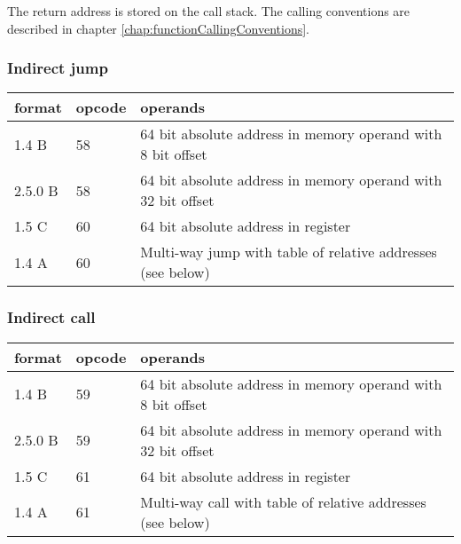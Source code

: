 \documentclass[forwardcom.tex]{subfiles}
\begin{document}
The return address is stored on the call stack. The calling conventions are described in chapter \ref{chap:functionCallingConventions}.


\subsubsection{Indirect jump}

\label{table:indirectJumpInstruction}
\begin{tabular}{|p{12mm}|p{12mm}|p{110mm}|}
\hline
\bfseries format & \bfseries opcode & \bfseries operands \\ \hline
1.4 B & 58 & 64 bit absolute address in memory operand with 8 bit offset \\ \hline
2.5.0 B & 58 & 64 bit absolute address in memory operand with 32 bit offset \\ \hline
1.5 C & 60 & 64 bit absolute address in register \\ \hline
1.4 A & 60 & Multi-way jump with table of relative addresses (see below) \\ \hline
\end{tabular}
\vspace{2mm}


\subsubsection{Indirect call}
\label{table:IndirectCallInstruction}
\begin{tabular}{|p{12mm}|p{12mm}|p{110mm}|}
\hline
\bfseries format & \bfseries opcode & \bfseries operands \\ \hline
1.4 B & 59 & 64 bit absolute address in memory operand with 8 bit offset \\ \hline
2.5.0 B & 59 & 64 bit absolute address in memory operand with 32 bit offset \\ \hline
1.5 C & 61 & 64 bit absolute address in register \\ \hline
1.4 A & 61 & Multi-way call with table of relative addresses (see below) \\ \hline\end{tabular}
\vspace{2mm}
\end{document}
